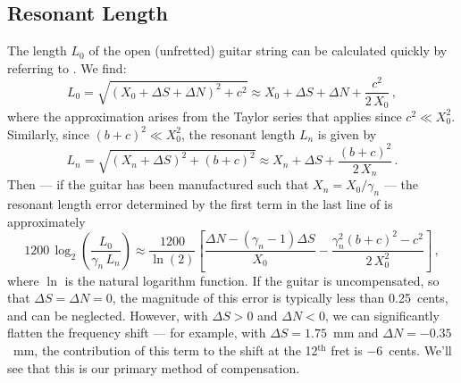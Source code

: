 \subsection{Resonant Length}
The length $L_0$ of the open (unfretted) guitar string can be calculated quickly by referring to . We find:
 \begin{equation}  \label{eqn:l_0_def}
L_0 = \sqrt{\left(X_0 + \Delta S + \Delta N\right)^2 + c^2} \approx X_0 + \Delta S + \Delta N + \frac{c^2}{2\, X_0}\, ,
 \end{equation}
where the approximation arises from the Taylor series that applies since $c^2 \ll X_0^2$. Similarly, since $(b + c)^2 \ll X_0^2$, the resonant length $L_n$ is given by
 \begin{equation}  \label{eqn:l_n_def}
L_n = \sqrt{\left(X_n + \Delta S\right)^2 + (b + c)^2} \approx X_n + \Delta S + \frac{(b + c)^2}{2\, X_n}\, .
 \end{equation}
Then --- if the guitar has been manufactured such that $X_n = X_0 / \gamma_n$ --- the resonant length error determined by the first term in the last line of  is approximately
  \begin{equation} \label{eqn:rle_approx}
  1200\, \log_2 \left( \frac{L_0}{\gamma_n\, L_n} \right) \approx \frac{1200}{\ln(2)} \left[ \frac{\Delta N - \left(\gamma_n - 1\right) \Delta S}{X_0} - \frac{\gamma_n^2 (b + c)^2 - c^2}{2\, X_0^2}\right]\, ,
  \end{equation}
where $\ln$ is the natural logarithm function. If the guitar is uncompensated, so that $\Delta S = \Delta N = 0$, the magnitude of this error is typically less than 0.25~cents, and can be neglected. However, with $\Delta S > 0$ and $\Delta N < 0$, we can significantly flatten the frequency shift --- for example, with $\Delta S = 1.75$~mm and $\Delta N = -0.35$~mm, the contribution of this term to the shift at the 12$^\text{th}$ fret is $-6$~cents. We'll see that this is our primary method of compensation.

